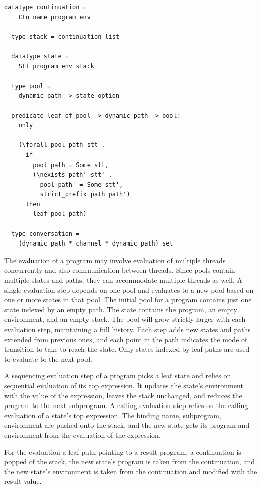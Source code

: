 \documentclass[10pt]{article}
\begin{document}
\begin{lstlisting}[language=logic, mathescape]
  datatype continuation =
    Ctn name program env

  type stack = continuation list

  datatype state =
    Stt program env stack 

  type pool =
    dynamic_path -> state option

  predicate leaf of pool -> dynamic_path -> bool:
    only

    (\forall pool path stt .
      if
        pool path = Some stt,
        (\nexists path' stt' .
          pool path' = Some stt',
          strict_prefix path path')
      then
        leaf pool path)

  type conversation =
    (dynamic_path * channel * dynamic_path) set
  \end{lstlisting}

The evaluation of a program may involve evaluation of multiple threads concurrently and also
communication between threads. Since pools contain multiple states and paths, they can
accommodate multiple threads as well.  A single evaluation step depends on one pool and
evaluates to a new pool based on one or more states in that pool. The initial pool for a
program contains just one state indexed by an empty path. The state contains the program, an
empty environment, and an empty stack. The pool will grow strictly larger with each evaluation
step, maintaining a full history. Each step adds new states and paths extended from previous
ones, and each point in the path indicates the mode of transition to take to reach the state.
Only states indexed by leaf paths are used to evaluate to the next pool.

A sequencing evaluation step of a program picks a leaf state and relies on
sequential evaluation of its top expression. It updates the state's environment with the
value of the expression, leaves the stack unchanged, and reduces the program to the next
subprogram. A calling evaluation step relies on the calling evaluation of a state's top
expression. The binding name, subprogram, environment are pushed onto the stack, and the new
state gets its program and environment from the evaluation of the expression. 

For the evaluation a leaf path pointing to a result program, a continuation is popped of the
stack, the new state's program is taken from the continuation, and the new state's environment
is taken from the continuation and modified with the result value.
\end{document}
